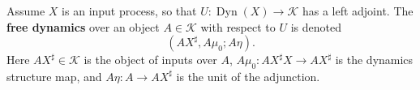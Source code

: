 Assume $X$ is an input process, so that $U: \operatorname{Dyn}(X) \to \mathcal{K}$ has a left adjoint. The \textbf{free dynamics} over an object $A \in \mathcal{K}$ with respect to $U$ is denoted
$$(AX^{\sharp}, A\mu_0; A\eta).$$
Here $AX^{\sharp} \in \mathcal{K}$ is the object of inputs over $A$, $A\mu_0: AX^{\sharp} X \to AX^{\sharp}$ is the dynamics structure map, and $A\eta: A \to AX^{\sharp}$ is the unit of the adjunction.
